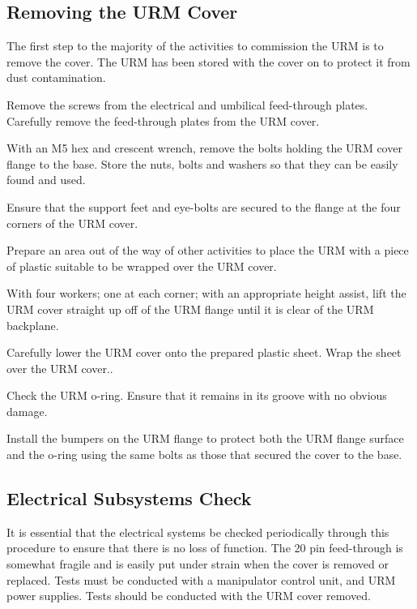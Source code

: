 \documentclass[11pt]{article}
\begin{document}
\subsection{Removing the URM Cover}\label{ss:rmCov}
The first step to the majority of the activities to commission the URM is to remove the cover. The URM has been stored with the cover on to protect it from dust contamination. 
\begin{answerlist}
\item Remove the screws from the electrical and umbilical feed-through plates. Carefully remove the feed-through plates from the URM cover.
\item With an M5 hex and crescent wrench, remove the bolts holding the URM cover flange to the base. Store the nuts, bolts and washers so that they can be easily found and used. 
\item Ensure that the support feet and eye-bolts are secured to the flange at the four corners of the URM cover.
\item Prepare an area out of the way of other activities to place the URM with a piece of plastic suitable to be wrapped over the URM cover.
\item With four workers; one at each corner; with an appropriate height assist, lift the URM cover straight up off of the URM flange until it is clear of the URM backplane.
\item Carefully lower the URM cover onto the prepared plastic sheet. Wrap the sheet over the URM cover.. 
\item Check the URM o-ring. Ensure that it remains in its groove with no obvious damage.
\item Install the bumpers on the URM flange to protect both the URM flange surface and the o-ring using the same bolts as those that secured the cover to the base. 
\end{answerlist}

\subsection{Electrical Subsystems Check}\label{ss:elecSSC}
It is essential that the electrical systems be checked periodically
through this procedure to ensure that there is no loss of
function. The 20 pin feed-through is somewhat fragile and is easily
put under strain when the cover is removed or replaced. Tests must be
conducted with a manipulator control unit, and URM power
supplies. Tests should be conducted with the URM cover removed.
\end{document}
